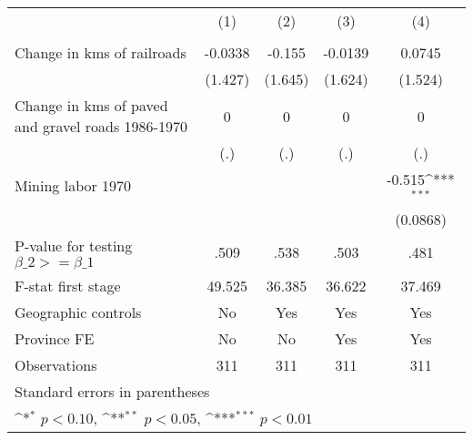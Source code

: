 {
\def\sym#1{\ifmmode^{#1}\else\(^{#1}\)\fi}
\begin{tabular}{l*{4}{c}}
\hline\hline
                &\multicolumn{1}{c}{(1)}&\multicolumn{1}{c}{(2)}&\multicolumn{1}{c}{(3)}&\multicolumn{1}{c}{(4)}\\
                &\multicolumn{1}{c}{}&\multicolumn{1}{c}{}&\multicolumn{1}{c}{}&\multicolumn{1}{c}{}\\
\hline
Change in kms of railroads&  -0.0338         &   -0.155         &  -0.0139         &   0.0745         \\
                &  (1.427)         &  (1.645)         &  (1.624)         &  (1.524)         \\
[1em]
Change in kms of paved and gravel roads 1986-1970&        0         &        0         &        0         &        0         \\
                &      (.)         &      (.)         &      (.)         &      (.)         \\
[1em]
Mining labor 1970&                  &                  &                  &   -0.515\sym{***}\\
                &                  &                  &                  & (0.0868)         \\
\hline
P-value for testing $\beta\_{2} >= \beta\_{1}$&     .509         &     .538         &     .503         &     .481         \\
F-stat first stage&   49.525         &   36.385         &   36.622         &   37.469         \\
Geographic controls&       No         &      Yes         &      Yes         &      Yes         \\
Province FE     &       No         &       No         &      Yes         &      Yes         \\
Observations    &      311         &      311         &      311         &      311         \\
\hline\hline
\multicolumn{5}{l}{\footnotesize Standard errors in parentheses}\\
\multicolumn{5}{l}{\footnotesize \sym{*} \(p<0.10\), \sym{**} \(p<0.05\), \sym{***} \(p<0.01\)}\\
\end{tabular}
}
